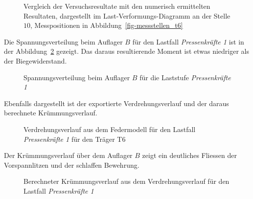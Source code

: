 \documentclass[
  11pt,
  letterpaper,
]{scrreprt}
\begin{document}
\begin{figure}[H]


\caption{\label{fig-p_w10_vergleich}Vergleich der Versuchsresultate mit
den numerisch ermittelten Resultaten, dargestellt im
Last-Verformungs-Diagramm an der Stelle \(10\), Messpositionen in
Abbildung~\ref{fig-messstellen_t6}}

\end{figure}%

Die Spannungsverteilung beim Auflager \(B\) für den Lastfall
\emph{Pressenkräfte 1} ist in der
Abbildung~\ref{fig-spannungsverteilung_ls8} gezeigt. Das daraus
resultierende Moment ist etwas niedriger als der Biegewiderstand.

\begin{figure}[H]


\caption{\label{fig-spannungsverteilung_ls8}Spannungsverteilung beim
Auflager \(B\) für die Laststufe \emph{Pressenkräfte 1}}

\end{figure}%

Ebenfalls dargestellt ist der exportierte Verdrehungsverlauf und der
daraus berechnete Krümmungsverlauf.

\begin{figure}[H]


\caption{\label{fig-phi-max-t6_l8}Verdrehungsverlauf aus dem Federmodell
für den Lastfall \emph{Pressenkräfte 1} für den Träger T6}

\end{figure}%

Der Krümmungsverlauf über dem Auflager \(B\) zeigt ein deutliches
Fliessen der Vorspannlitzen und der schlaffen Bewehrung.

\begin{figure}[H]


\caption{\label{fig-chi-max-t6l8}Berechneter Krümmungsverlauf aus dem
Verdrehungsverlauf für den Lastfall \emph{Pressenkräfte 1}}

\end{figure}%
\end{document}
